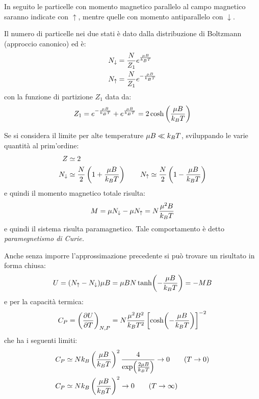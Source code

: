 In seguito le particelle con momento magnetico parallelo al campo magnetico saranno indicate con $ \uparrow $, mentre quelle con momento antiparallelo con $ \downarrow $.

Il numero di particelle nei due stati è dato dalla distribuzione di Boltzmann (approccio canonico) ed è:
\begin{align*}
N_\downarrow &= \frac{N}{Z_1} e^{\frac{\mu B}{k_B T}}\\
N_\uparrow &= \frac{N}{Z_1} e^{-\frac{\mu B}{k_B T}}
\end{align*}
con la funzione di partizione $ Z_1 $ data da:
\begin{equation*}
Z_1 = e^{-\frac{\mu B}{k_B T}} + e^{\frac{\mu B}{k_B T}} = 2 \cosh\left(\frac{\mu B}{k_B T}\right)
\end{equation*}

Se si considera il limite per alte temperature $ \mu B \ll k_B T $, sviluppando le varie quantità al prim'ordine:
\begin{align*}
Z &\simeq 2\\
N_\downarrow &\simeq \frac{N}{2} \left(1 + \frac{\mu B}{k_B T}\right) \qquad N_\uparrow \simeq \frac{N}{2} \left(1 - \frac{\mu B}{k_B T}\right)\\
\end{align*}
e quindi il momento magnetico totale risulta:
\begin{equation*}
M = \mu N_\downarrow - \mu N_\uparrow = N \frac{\mu^2 B}{k_B T}
\end{equation*}
e quindi il sistema risulta paramagnetico. Tale comportamento è detto \textit{paramegnetismo di Curie.}
\newline

Anche senza imporre l'approssimazione precedente si può trovare un risultato in forma chiusa:
\begin{equation*}
U = (N_\uparrow - N_\downarrow) \mu B = \mu B N \tanh(-\frac{\mu B}{k_B T}) = -M B
\end{equation*}
e per la capacità termica:
\begin{equation*}
C_P = \left(\frac{\partial {U}}{\partial {T}}\right)_{N,P} = N \frac{\mu^2 B^2}{k_B T^2} \left[\cosh(-\frac{\mu B}{k_B T})\right]^{-2}
\end{equation*}
che ha i seguenti limiti:
\begin{align*}
C_P &\simeq N k_B \left(\frac{\mu B}{k_B T}\right)^2 \frac{4}{\exp(\frac{2\mu B}{k_B T})} \rightarrow 0 \qquad (T\rightarrow 0)\\
C_P &\simeq N k_B \left(\frac{\mu B}{k_B T}\right)^2 \rightarrow 0 \qquad (T \rightarrow \infty)
\end{align*}

